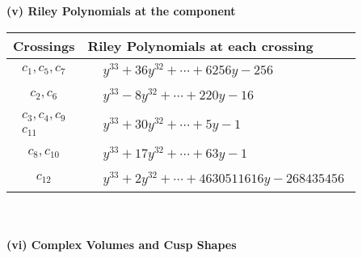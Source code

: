 \documentclass[1p]{elsarticle_modified}
\theoremstyle{definition}
\begin{document}
\newpage\renewcommand{\arraystretch}{1}
\flushleft \textbf{(v) Riley Polynomials at the component}\newline \\
\begin{tabular}{m{50pt}|m{274pt}}
Crossings & \hspace{64pt}Riley Polynomials at each crossing \\
\hline $$\begin{aligned}c_{1},c_{5},c_{7}\end{aligned}$$&$\begin{aligned}
&y^{33}+36 y^{32}+\cdots+6256 y-256
\end{aligned}$\\
\hline $$\begin{aligned}c_{2},c_{6}\end{aligned}$$&$\begin{aligned}
&y^{33}-8 y^{32}+\cdots+220 y-16
\end{aligned}$\\
\hline $$\begin{aligned}c_{3},c_{4},c_{9}\\c_{11}\end{aligned}$$&$\begin{aligned}
&y^{33}+30 y^{32}+\cdots+5 y-1
\end{aligned}$\\
\hline $$\begin{aligned}c_{8},c_{10}\end{aligned}$$&$\begin{aligned}
&y^{33}+17 y^{32}+\cdots+63 y-1
\end{aligned}$\\
\hline $$\begin{aligned}c_{12}\end{aligned}$$&$\begin{aligned}
&y^{33}+2 y^{32}+\cdots+4630511616 y-268435456
\end{aligned}$\\
\hline
\end{tabular}\\~\\
\newpage\flushleft \textbf{(vi) Complex Volumes and Cusp Shapes}
\end{document}
